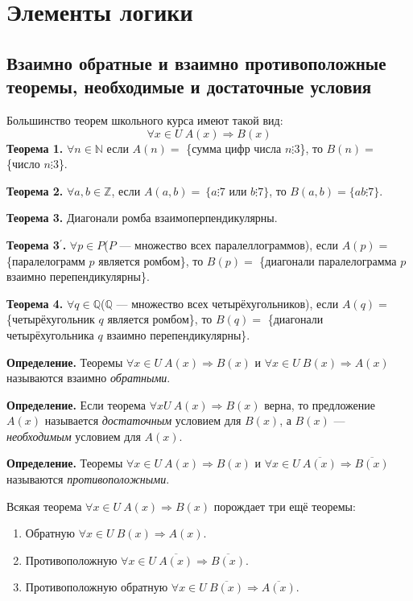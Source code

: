 \documentclass{article}
\begin{document}
    \section{Элементы логики}

    \subsection{Взаимно обратные и взаимно противоположные теоремы, необходимые и достаточные условия}

    Большинство теорем школьного курса имеют такой вид:
    \[\forall x \in U\ A(x) \Rightarrow B(x)\]
    \textbf{Теорема 1.} \(\forall n \in \mathbb{N}\) если \(A(n)=\) \{сумма цифр числа \(n \vdots 3\)\}, то \(B(n)=\) \{число \(n \vdots 3\)\}.

    \textbf{Теорема 2.} \(\forall a, b \in \mathbb{Z}\), если \(A(a,b)=\ \{a \vdots 7\) или \(b \vdots 7\}\), то \(B(a,b)=\{ab \vdots 7\}\).

    \textbf{Теорема 3.} Диагонали ромба взаимоперпендикулярны.

    \textbf{Теорема 3\(^\prime\).} \(\forall p \in P\)(\(P\) --- множество всех паралеллограммов), если \(A(p)=\) \{паралелограмм \(p\) является ромбом\}, то \(B(p)=\) \{диагонали паралелограмма \(p\) взаимно перепендикулярны\}.

    \textbf{Теорема 4.} \(\forall q \in \mathbb{Q}\)(\(\mathbb{Q}\) --- множество всех четырёхугольников), если \(A(q)=\) \{четырёхугольник \(q\) является ромбом\}, то \(B(q)=\) \{диагонали четырёхугольника \(q\) взаимно перепендикулярны\}.

    \textbf{Определение.} Теоремы \(\forall x \in U\ A(x) \Rightarrow B(x)\) и \(\forall x \in U\ B(x) \Rightarrow A(x)\) называются взаимно \textit{обратными}.

    \textbf{Определение.} Если теорема \(\forall x U\ A(x) \Rightarrow B(x)\) верна, то предложение \(A(x)\) называется \textit{достаточным} условием для \(B(x)\), а \(B(x)\) --- \textit{необходимым} условием для \(A(x)\).

    \textbf{Определение.} Теоремы \(\forall x \in U\ A(x) \Rightarrow B(x)\) и \(\forall x \in U\ \overline{A(x)} \Rightarrow \overline{B(x)}\) называются \textit{противоположными}.

    Всякая теорема \(\forall x \in U\ A(x) \Rightarrow B(x)\) порождает три ещё теоремы:
    \begin{enumerate}
        \item Обратную \(\forall x \in U\ B(x) \Rightarrow A(x)\).
        \item Противоположную \(\forall x \in U\ \overline{A(x)} \Rightarrow \overline{B(x)}\).
        \item Противоположную обратную \(\forall x \in U\ \overline{B(x)} \Rightarrow \overline{A(x)}\).
    \end{enumerate}
\end{document}
